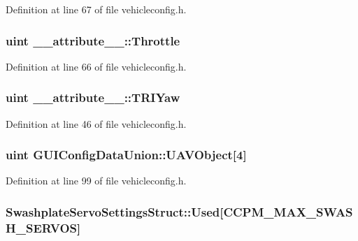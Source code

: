 Definition at line 67 of file vehicleconfig.\-h.

\hypertarget{group___config_plugin_ga5045493288e2ee044c68dafe0a02b05c}{
\subsubsection[{Throttle}]{\setlength{\rightskip}{0pt plus 5cm}uint \-\_\-\-\_\-attribute\-\_\-\-\_\-\-::\-Throttle}}\label{group___config_plugin_ga5045493288e2ee044c68dafe0a02b05c}


Definition at line 66 of file vehicleconfig.\-h.

\hypertarget{group___config_plugin_ga63632c414ddd0db93282a775cff6ee2b}{
\subsubsection[{T\-R\-I\-Yaw}]{\setlength{\rightskip}{0pt plus 5cm}uint \-\_\-\-\_\-attribute\-\_\-\-\_\-\-::\-T\-R\-I\-Yaw}}\label{group___config_plugin_ga63632c414ddd0db93282a775cff6ee2b}


Definition at line 46 of file vehicleconfig.\-h.

\hypertarget{group___config_plugin_ga1a1fbf9187086cc92fac84f33f19402f}{
\subsubsection[{U\-A\-V\-Object}]{\setlength{\rightskip}{0pt plus 5cm}uint G\-U\-I\-Config\-Data\-Union\-::\-U\-A\-V\-Object\mbox{[}4\mbox{]}}}\label{group___config_plugin_ga1a1fbf9187086cc92fac84f33f19402f}


Definition at line 99 of file vehicleconfig.\-h.

\hypertarget{group___config_plugin_ga9fda1ee21effccd7fcbad04816734eac}{
\subsubsection[{Used}]{ Swashplate\-Servo\-Settings\-Struct\-::\-Used\mbox{[}C\-C\-P\-M\-\_\-\-M\-A\-X\-\_\-\-S\-W\-A\-S\-H\-\_\-\-S\-E\-R\-V\-O\-S\mbox{]}}}\label{group___config_plugin_ga9fda1ee21effccd7fcbad04816734eac}


